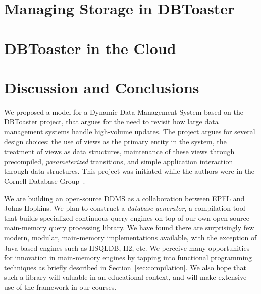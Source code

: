 \documentclass{sig-alternate}
\newcommand{\tinysection}[1]{\vspace{0.5mm}\noindent{\bf #1.}}
\begin{document}
\section{Managing Storage in DBToaster}
\label{sec:storage}



\section{DBToaster in the Cloud}
\label{sec:distribution}


\section{Discussion and Conclusions}
We proposed a model for a Dynamic Data Management System based on the DBToaster
project, that argues for the need to revisit how large data management systems
handle high-volume updates. The project argues for several design choices: the
use of views as the primary entity in the system, the treatment of
views as data structures, maintenance of these views through precompiled,
\textit{parameterized} transitions, and simple application interaction
through data structures. This project was initiated while the authors were in
the Cornell Database Group~\cite{ahmad-vldb:09}.

\tinysection{Implementation plan}
We are building an open-source DDMS as a collaboration between EPFL and Johns
Hopkins. We plan to construct a \textit{database generator}, a compilation tool
that builds specialized continuous query engines on top of our own open-source
main-memory query processing library. We have found there are surprisingly few
modern, modular, main-memory implementations available, with the exception of
Java-based engines such as HSQLDB, H2, etc. We perceive many opportunities for
innovation in main-memory engines by tapping into functional programming
techniques as briefly described in Section~\ref{sec:compilation}. We also hope
that such a library will valuable in an educational context, and will make extensive use
of the framework in our courses.




\end{document}
